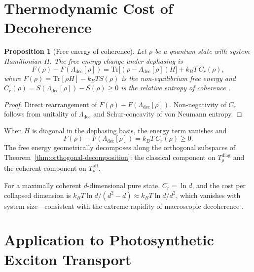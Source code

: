 \documentclass[12pt,a4paper]{article}
\newtheorem{proposition}[theorem]{Proposition}
\theoremstyle{definition}
\theoremstyle{remark}
\begin{document}
\section{Thermodynamic Cost of Decoherence}
\label{sec:thermodynamics}

\begin{proposition}[Free energy of coherence]
\label{prop:free-energy-coherence}
Let $\rho$ be a quantum state with system Hamiltonian $H$. The free energy change under dephasing is
\begin{equation}
\label{eq:free-energy-general}
F(\rho) - F(\Lambda_{\mathrm{dec}}[\rho]) = \mathrm{Tr}\bigl[(\rho - \Lambda_{\mathrm{dec}}[\rho]) H\bigr] + k_B T\, C_r(\rho),
\end{equation}
where $F(\rho) = \mathrm{Tr}[\rho H] - k_B T S(\rho)$ is the non-equilibrium free energy and $C_r(\rho) = S(\Lambda_{\mathrm{dec}}[\rho]) - S(\rho) \geq 0$ is the relative entropy of coherence \cite{streltsov2017colloquium}.
\end{proposition}

\begin{proof}
Direct rearrangement of $F(\rho) - F(\Lambda_{\mathrm{dec}}[\rho])$. Non-negativity of $C_r$ follows from unitality of $\Lambda_{\mathrm{dec}}$ and Schur-concavity of von Neumann entropy.
\end{proof}

When $H$ is diagonal in the dephasing basis, the energy term vanishes and
\begin{equation}
\label{eq:free-energy-diagonal-H}
F(\rho) - F(\Lambda_{\mathrm{dec}}[\rho]) = k_B T\, C_r(\rho) \geq 0.
\end{equation}
The free energy geometrically decomposes along the orthogonal subspaces of Theorem~\ref{thm:orthogonal-decomposition}: the classical component on $T_\rho^{\mathrm{diag}}$ and the coherent component on $T_\rho^{\mathrm{off}}$.

For a maximally coherent $d$-dimensional pure state, $C_r = \ln d$, and the cost per collapsed dimension is $k_B T \ln d/(d^2 - d) \approx k_B T \ln d / d^2$, which vanishes with system size---consistent with the extreme rapidity of macroscopic decoherence \cite{zurek2003decoherence}.

\section{Application to Photosynthetic Exciton Transport}
\label{sec:fmo}
\end{document}
